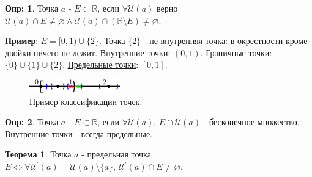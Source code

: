 \documentclass[12pt]{article}
\theoremstyle{definition}
\newtheorem{defn}{Опр:}
\newtheorem{theorem}{Теорема}
\begin{document}
\begin{defn}
	Точка $a$ -  $E \subset \mathbb{R}$, если $\forall \mathcal{U}(a)$ верно $\mathcal{U}(a) \cap E \neq \varnothing \wedge \mathcal{U}(a) \cap (\mathbb{R} \setminus E)  \neq \varnothing$.
\end{defn}

\textbf{Пример}: $E = [0,1) \cup \{2\}$. Точка $\{2\}$ - не внутренняя точка: в окрестности кроме двойки ничего не лежит. 
\uline{Внутренние точки}: $(0,1)$. \uline{Граничные точки}: $\{0\} \cup \{1\} \cup \{2\}$. \uline{Предельные точки}: $[0,1]$.
	
\begin{figure}[H]
	\centering
	\includegraphics[width=0.35\textwidth]{12_2.eps}
	\caption{Пример классификации точек.}
	\label{12_2}
\end{figure}

\begin{defn}
	Точка $a$ -  $E \subset \mathbb{R}$, если $\forall \mathcal{U}(a), \, E \cap \mathcal{U}(a)$ - бесконечное множество. Внутренние точки - всегда предельные.
\end{defn}


\begin{theorem}
	Точка $a$ - предельная точка $E \Leftrightarrow \forall \mathcal{U}^\prime(a) = \mathcal{U}(a) \setminus \{a\}, \, \mathcal{U}^\prime(a) \cap E \neq \varnothing$.
\end{theorem}
\end{document}
